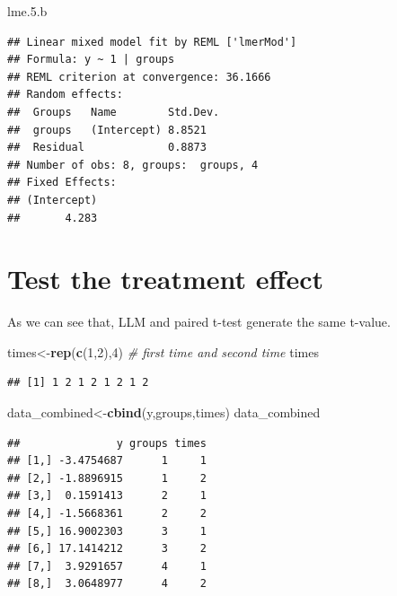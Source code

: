 \documentclass[]{book}
\newenvironment{Shaded}{\begin{snugshade}}{\end{snugshade}}
\newcommand{\CommentTok}[1]{\textcolor[rgb]{0.56,0.35,0.01}{\textit{#1}}}
\newcommand{\DecValTok}[1]{\textcolor[rgb]{0.00,0.00,0.81}{#1}}
\newcommand{\FloatTok}[1]{\textcolor[rgb]{0.00,0.00,0.81}{#1}}
\newcommand{\KeywordTok}[1]{\textcolor[rgb]{0.13,0.29,0.53}{\textbf{#1}}}
\newcommand{\NormalTok}[1]{#1}
\begin{document}
\begin{Shaded}
\begin{Highlighting}[]
\NormalTok{lme.}\FloatTok{5.}\NormalTok{b }
\end{Highlighting}
\end{Shaded}

\begin{verbatim}
## Linear mixed model fit by REML ['lmerMod']
## Formula: y ~ 1 | groups
## REML criterion at convergence: 36.1666
## Random effects:
##  Groups   Name        Std.Dev.
##  groups   (Intercept) 8.8521  
##  Residual             0.8873  
## Number of obs: 8, groups:  groups, 4
## Fixed Effects:
## (Intercept)  
##       4.283
\end{verbatim}

\hypertarget{test-the-treatment-effect}{%
\section{Test the treatment effect}\label{test-the-treatment-effect}}

As we can see that, LLM and paired t-test generate the same t-value.

\begin{Shaded}
\begin{Highlighting}[]
\NormalTok{times<-}\KeywordTok{rep}\NormalTok{(}\KeywordTok{c}\NormalTok{(}\DecValTok{1}\NormalTok{,}\DecValTok{2}\NormalTok{),}\DecValTok{4}\NormalTok{) }\CommentTok{# first time and second time}
\NormalTok{times}
\end{Highlighting}
\end{Shaded}

\begin{verbatim}
## [1] 1 2 1 2 1 2 1 2
\end{verbatim}

\begin{Shaded}
\begin{Highlighting}[]
\NormalTok{data_combined<-}\KeywordTok{cbind}\NormalTok{(y,groups,times)}
\NormalTok{data_combined}
\end{Highlighting}
\end{Shaded}

\begin{verbatim}
##               y groups times
## [1,] -3.4754687      1     1
## [2,] -1.8896915      1     2
## [3,]  0.1591413      2     1
## [4,] -1.5668361      2     2
## [5,] 16.9002303      3     1
## [6,] 17.1414212      3     2
## [7,]  3.9291657      4     1
## [8,]  3.0648977      4     2
\end{verbatim}
\end{document}
